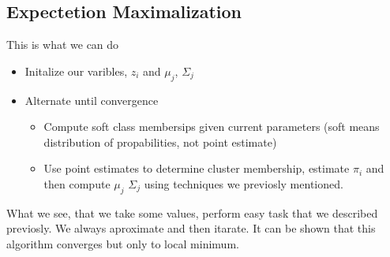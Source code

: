 \documentclass[12pt,a4paper]{article}
\begin{document}
\subsection{Expectetion Maximalization}
This is what we can do
\begin{itemize}
    \item Initalize our varibles, $z_i$ and $\mu_j$, $\Sigma_j$
    \item Alternate until convergence \begin{itemize}
        \item   Compute soft class membersips given current parameters (soft means distribution of propabilities, not point estimate)
        \item   Use point estimates to determine cluster membership, estimate $\pi_i$ and then compute $\mu_j$ $\Sigma_j$ using techniques we previosly mentioned. 
    \end{itemize}
\end{itemize}
What we see, that we take some values, perform easy task that we described previosly. We always aproximate and then itarate. It can be shown that this algorithm converges but only
to local minimum.
\end{document}
